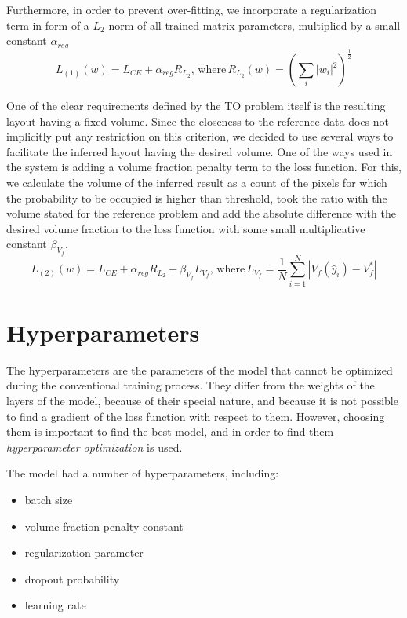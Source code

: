 Furthermore, in order to prevent over-fitting, we incorporate a regularization term in form of a $L_{2}$ norm of all trained matrix parameters, multiplied by a small constant $\alpha_{reg}$
\begin{equation}
 	L_{(1)}(w) = L_{CE} + \alpha_{reg} R_{L_{2}}, \, \mathrm{where} \, R_{L_{2}}(w) = ( \sum_{i}^{} |w_{i}|^{2} )^{\frac{1}{2}} 
 	\label{eq:loss_reg}
\end{equation}
\medskip

One of the clear requirements defined by the TO problem itself is the resulting layout having a fixed volume. 
Since the closeness to the reference data does not implicitly put any restriction on this criterion, we decided to use several ways to facilitate the inferred layout having the desired volume.
One of the ways used in the system is adding a volume fraction penalty term to the loss function.
For this, we calculate the volume of the inferred result as a count of the pixels for which the probability to be occupied is higher than threshold, took the ratio with the volume stated for the reference problem and add the absolute difference with the desired volume fraction to the loss function with some small multiplicative constant $\beta_{V_{f}}$.
\begin{equation}
	L_{(2)}(w) = L_{CE} + \alpha_{reg} R_{L_{2}} + \beta_{V_{f}}  L_{V_{f}} , \, \mathrm{where} \, L_{V_{f}} = \frac{1}{N} \sum_{i=1}^{N} |V_{f}(\hat{y}_{i}) - V_{f}^{\ast}|
	\label{eq:loss_vfpen}
\end{equation}


\section{Hyperparameters}

The hyperparameters are the parameters of the model that cannot be optimized during the conventional training process.
They differ from the weights of the layers of the model, because of their special nature, and because it is not possible to find a gradient of the loss function with respect to them.
However, choosing them is important to find the best model, and in order to find them \emph{hyperparameter optimization} is used.
\medskip

The model had a number of hyperparameters, including:
\begin{itemize}
	\item batch size
	\item volume fraction penalty constant
	\item regularization parameter
	\item dropout probability 
	\item learning rate
\end{itemize}

